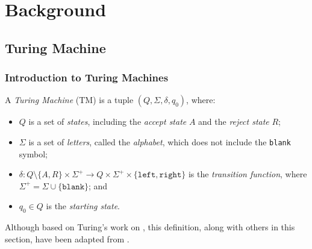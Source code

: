 \chapter{Background}
\section{Turing Machine}
\subsection{Introduction to Turing Machines}
A \emph{Turing Machine} (TM) is a tuple $(Q, \Sigma, \delta, q_0)$, where:
\begin{itemize}
    \item $Q$ is a set of \emph{states}, including the \emph{accept state} $A$ and the \emph{reject state} $R$;
    \item $\Sigma$ is a set of \emph{letters}, called the \emph{alphabet}, which does not include the \texttt{blank} symbol;
    \item $\delta \colon Q \setminus \{A, R\} \times \Sigma^+ \to Q \times \Sigma^+ \times \{\texttt{left}, \texttt{right}\}$ is the \emph{transition function}, where $\Sigma^+ = \Sigma \cup \{\texttt{blank}\}$; and
    \item $q_0 \in Q$ is the \emph{starting state}.
\end{itemize}
Although based on Turing's work on \citet{turing1936computable}, this definition, along with others in this section, have been adapted from \citet{hopcroft2001automata}.


